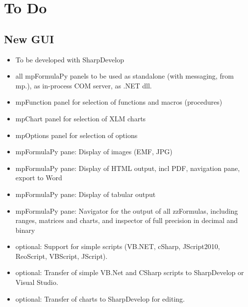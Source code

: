 	
	
	
	
	\newpage
	\section{To Do}
	
	\subsection{New GUI}
	\begin{itemize}
		\item To be developed with SharpDevelop
		
		\item all mpFormulaPy panels to be used as standalone (with messaging, from mp.), as in-process COM server, as .NET dll.
		\item mpFunction panel for selection of functions and macros (procedures)
		\item mpChart panel for selection of XLM charts
		\item mpOptions panel for selection of options
		
		\item mpFormulaPy pane: Display of images (EMF, JPG)
		\item mpFormulaPy pane: Display of HTML output, incl PDF, navigation pane, export to Word
		\item mpFormulaPy pane: Display of tabular output	
		\item mpFormulaPy pane: Navigator for the output of all zzFormulas, including ranges, matrices and charts, and inspector of full precision in decimal and binary
		\item optional: Support for simple scripts (VB.NET, cSharp, JScript2010, ReoScript, VBScript, JScript).
		\item optional: Transfer of simple VB.Net and CSharp scripts to SharpDevelop or Visual Studio.
		\item optional: Transfer of charts to SharpDevelop for editing.
		
	\end{itemize}
	
	
	
	
	
